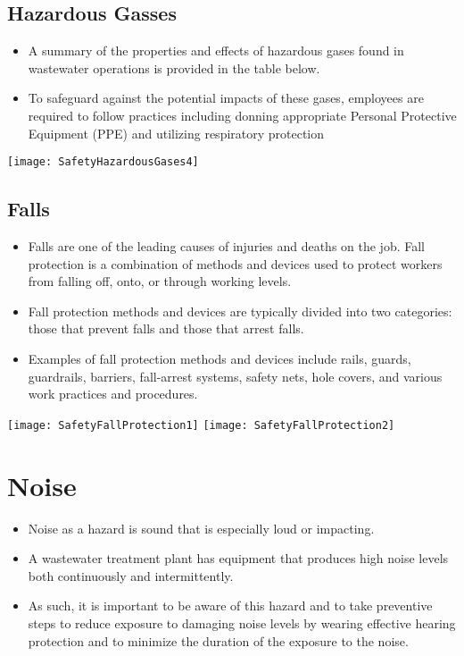 \subsection{Hazardous Gasses}
\begin{itemize}
\item A summary of the properties and effects of hazardous gases found in wastewater operations is provided in the table below.
\item To safeguard against the potential impacts of these gases, employees are required to follow practices including donning appropriate Personal Protective Equipment (PPE) and utilizing respiratory protection\\
\end{itemize}
\begin{center}
\texttt{[image: SafetyHazardousGases4]}\\ 
\end{center}

\subsection{Falls}
\begin{itemize}
\item Falls are one of the leading causes of injuries and deaths on the job.  Fall protection is a combination of methods and devices used to protect workers from falling off, onto, or through working levels. 
\item Fall protection methods and devices are typically divided into two categories: those that prevent falls and those that arrest falls. 
\item Examples of fall protection methods and devices include rails, guards, guardrails, barriers, fall-arrest systems, safety nets, hole covers, and various work practices and procedures.
\end{itemize}
\begin{center}
\texttt{[image: SafetyFallProtection1]}\hspace{1cm} \texttt{[image: SafetyFallProtection2]}\\
\end{center}
\section{Noise}
\begin{itemize}
\item Noise as a hazard is sound that is especially loud or impacting. 
\item A wastewater treatment plant has equipment that produces high noise levels both continuously and intermittently. 
\item As such, it is important to be aware of this hazard and to take preventive steps to reduce exposure to damaging noise levels by wearing effective hearing protection and to minimize the duration of the exposure to the noise.
\end{itemize}

